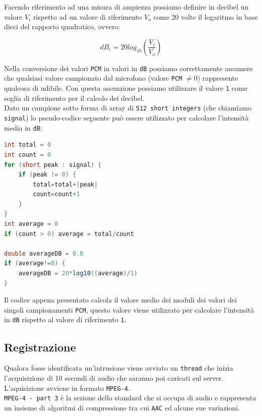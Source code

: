 Facendo riferimento ad una misura di ampiezza possiamo definire in decibel un valore $V_i$ rispetto ad un valore di riferimento $V_o$ come 20 volte il logaritmo in base dieci del rapporto quadratico, ovvero:

\begin{equation}
dB_i = 20log_{10} \left(\frac{V_i}{V_o}\right)
\end{equation}

Nella conversione dei valori \texttt{PCM} in valori in \texttt{dB} possiamo correttamente assumere che qualsiasi valore campionato dal microfono (valore \texttt{PCM} $\neq 0$) rappresente qualcosa di udibile. Con questa assunzione possiamo utilizzare il valore \texttt{1} come soglia di riferimento per il calcolo dei decibel.\\

Dato un campione sotto forma di array di \texttt{512 short integers} (che chiamiamo \texttt{signal}) lo pseudo-codice seguente può essere utilizzato per calcolare l'intensità media in \texttt{dB}:

\begin{lstlisting}[language=Java, caption=Pseudo-codice per calcolare i valori in decibel da campionamento PCM]
int total = 0
int count = 0
for (short peak : signal) {
	if (peak != 0) {
		total=total+|peak|
		count=count+1
	}
}
int average = 0
if (count > 0) average = total/count

double averageDB = 0.0
if (average!=0) {
	averageDB = 20*log10((average)/1)
}
\end{lstlisting}

Il codice appena presentato calcola il valore medio dei moduli dei valori dei singoli campionamenti \texttt{PCM}, questo valore viene utilizzato per calcolare l'intensità in \texttt{dB} rispetto al valore di riferimento \texttt{1}.

\subsection{Registrazione}
Qualora fosse identificata un'intrusione viene avviato un \texttt{thread} che inizia l'acquisizione di 10 secondi di audio che saranno poi caricati sul server.\\

L'aquisizione avviene in formato \texttt{MPEG-4}.\\

\texttt{MPEG-4 - part 3} è la sezione dello standard che si occupa di audio e rappresenta un insieme di algoritmi di compressione tra cui \texttt{AAC} ed alcune sue variazioni.\\

